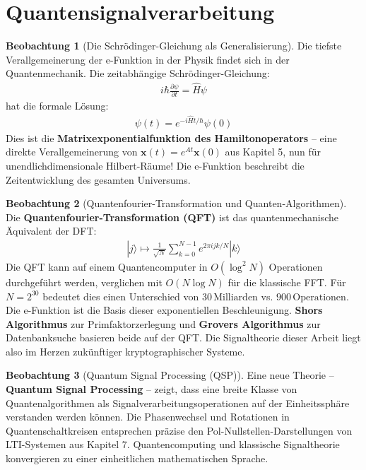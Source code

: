 ﻿\documentclass[a4paper,12pt]{report}
\theoremstyle{definition}
\newtheorem{beobachtung}{Beobachtung}
\begin{document}
	\section{Quantensignalverarbeitung}
	
	\begin{beobachtung}[Die Schrödinger-Gleichung als Generalisierung]
		Die tiefste Verallgemeinerung der e-Funktion in der Physik findet sich in der Quantenmechanik. Die zeitabhängige Schrödinger-Gleichung:
		\begin{align}
			i\hbar \frac{\partial \psi}{\partial t} = \hat{H} \psi
		\end{align}
		hat die formale Lösung:
		\begin{align}
			\psi(t) = e^{-i\hat{H}t/\hbar} \psi(0)
		\end{align}
		Dies ist die \textbf{Matrixexponentialfunktion des Hamiltonoperators} -- eine direkte Verallgemeinerung von $\mathbf{x}(t) = e^{At}\mathbf{x}(0)$ aus Kapitel 5, nun für unendlichdimensionale Hilbert-Räume! Die e-Funktion beschreibt die Zeitentwicklung des gesamten Universums.
	\end{beobachtung}
	
	\begin{beobachtung}[Quantenfourier-Transformation und Quanten-Algorithmen]
		Die \textbf{Quan\-tenfourier-Transformation (QFT)} ist das quantenmechanische Äquivalent der DFT:
		\begin{align}
			|j\rangle \mapsto \frac{1}{\sqrt{N}} \sum_{k=0}^{N-1} e^{2\pi i jk/N} |k\rangle
		\end{align}
		Die QFT kann auf einem Quantencomputer in $O(\log^2 N)$ Operationen durchgeführt werden, verglichen mit $O(N \log N)$ für die klassische FFT. Für $N = 2^{30}$ bedeutet dies einen Unterschied von $30\,\text{Milliarden}$ vs. $900\,\text{Operationen}$. Die e-Funktion ist die Basis dieser exponentiellen Beschleunigung. \textbf{Shors Algorithmus} zur Primfaktorzerlegung und \textbf{Grovers Algorithmus} zur Datenbanksuche basieren beide auf der QFT. Die Signaltheorie dieser Arbeit liegt also im Herzen zukünftiger kryptographischer Systeme.
	\end{beobachtung}
	
	\begin{beobachtung}[Quantum Signal Processing (QSP)]
		Eine neue Theorie -- \textbf{Quantum Signal Processing} -- zeigt, dass eine breite Klasse von Quantenalgorithmen als Signalverarbeitungsoperationen auf der Einheitssphäre verstanden werden können. Die Phasenwechsel und Rotationen in Quantenschaltkreisen entsprechen präzise den Pol-Nullstellen-Darstellungen von LTI-Systemen aus Kapitel 7. Quantencomputing und klassische Signaltheorie konvergieren zu einer einheitlichen mathematischen Sprache.
	\end{beobachtung}
	
\end{document}
